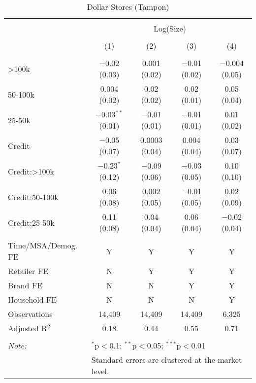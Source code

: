 
\begin{table}[!htbp] \centering 
  \caption{Dollar Stores (Tampon)} 
  \label{tab:packageSizeDollarTamponLiq} 
\begin{tabular}{@{\extracolsep{5pt}}lcccc} 
\\[-1.8ex]\hline 
\hline \\[-1.8ex] 
 & \multicolumn{4}{c}{Log(Size)} \\ 
\\[-1.8ex] & (1) & (2) & (3) & (4)\\ 
\hline \\[-1.8ex] 
 >100k & $-$0.02 (0.03) & 0.001 (0.02) & $-$0.01 (0.02) & $-$0.004 (0.05) \\ 
  50-100k & 0.004 (0.02) & 0.02 (0.02) & 0.02 (0.01) & 0.05 (0.04) \\ 
  25-50k & $-$0.03$^{**}$ (0.01) & $-$0.01 (0.01) & $-$0.01 (0.01) & 0.01 (0.02) \\ 
  Credit & $-$0.05 (0.07) & 0.0003 (0.04) & 0.004 (0.04) & 0.03 (0.07) \\ 
  Credit:>100k & $-$0.23$^{*}$ (0.12) & $-$0.09 (0.06) & $-$0.03 (0.05) & 0.10 (0.10) \\ 
  Credit:50-100k & 0.06 (0.08) & 0.002 (0.05) & $-$0.01 (0.05) & 0.02 (0.09) \\ 
  Credit:25-50k & 0.11 (0.08) & 0.04 (0.04) & 0.06 (0.04) & $-$0.02 (0.04) \\ 
 \hline \\[-1.8ex] 
Time/MSA/Demog. FE & Y & Y & Y & Y \\ 
Retailer FE & N & Y & Y & Y \\ 
Brand FE & N & N & Y & Y \\ 
Household FE & N & N & N & Y \\ 
Observations & 14,409 & 14,409 & 14,409 & 6,325 \\ 
Adjusted R$^{2}$ & 0.18 & 0.44 & 0.55 & 0.71 \\ 
\hline 
\hline \\[-1.8ex] 
\textit{Note:}  & \multicolumn{4}{l}{$^{*}$p$<$0.1; $^{**}$p$<$0.05; $^{***}$p$<$0.01} \\ 
 & \multicolumn{4}{l}{Standard errors are clustered at the market level.} \\ 
\end{tabular} 
\end{table} 
